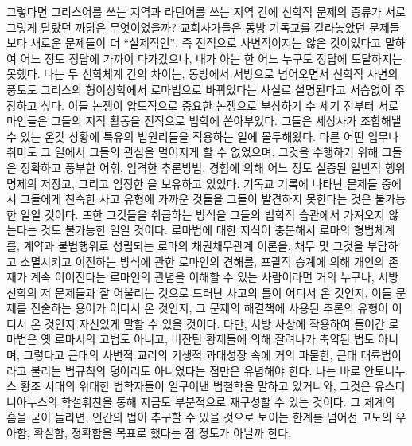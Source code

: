 그렇다면
그리스어를 쓰는 지역과
라틴어를 쓰는 지역 간에
신학적 문제의 종류가 서로 그렇게 달랐던 까닭은 무엇이었을까?
교회사가들은
동방 기독교를 갈라놓았던 문제들보다
새로운 문제들이
더 ``실제적인'',
즉 전적으로 사변적이지는 않은 것이었다고 말하여
어느 정도 정답에 가까이 다가갔으나,
내가 아는 한 어느 누구도 정답에 도달하지는 못했다.
나는
두 신학체계 간의 차이는,
동방에서 서방으로 넘어오면서
신학적 사변의 풍토도
그리스의 형이상학에서 로마법으로 바뀌었다는 사실로
설명된다고
서슴없이 주장하고 싶다.
이들 논쟁이 압도적으로 중요한 논쟁으로 부상하기
수 세기 전부터
서로마인들은 그들의 지적 활동을 전적으로 법학에 쏟아부었다.
그들은
세상사가 조합해낼 수 있는 온갖 상황에
특유의 법원리들을
적용하는 일에 몰두해왔다.
다른 어떤 업무나 취미도
그 일에서 그들의 관심을 멀어지게 할 수 없었으며,
그것을 수행하기 위해 그들은
정확하고 풍부한 어휘,
엄격한 추론방법,
경험에 의해 어느 정도 실증된 일반적 행위 명제의 저장고,
그리고 엄정한 을
보유하고 있었다.
기독교 기록에 나타난 문제들 중에서
그들에게 친숙한 사고 유형에 가까운 것들을
그들이
발견하지 못한다는 것은 불가능한 일일 것이다.
또한 그것들을 취급하는 방식을
그들의 법학적 습관에서 가져오지 않는다는 것도 불가능한 일일 것이다.
로마법에 대한 지식이 충분해서
로마의 형법체계를,
계약과 불법행위로 성립되는 로마의 채권채무관계 이론을,
채무 및 그것을 부담하고 소멸시키고 이전하는 방식에 관한
로마인의 견해를,
포괄적 승계에 의해 개인의 존재가 계속 이어진다는 로마인의 관념을
이해할 수 있는 사람이라면 거의 누구나,
서방 신학의 저 문제들과 잘 어울리는 것으로 드러난 사고의 틀이 어디서 온 것인지,
이들 문제를 진술하는 용어가 어디서 온 것인지,
그 문제의 해결책에 사용된 추론의 유형이 어디서 온 것인지
자신있게 말할 수 있을 것이다.
다만,
서방 사상에 작용하여 들어간 로마법은
옛 로마시의 고법도 아니고,
비잔틴 황제들에 의해 잘려나가 축약된 법도 아니며,
그렇다고 근대의 사변적 교리의 기생적 과대성장 속에 거의 파묻힌,
근대 대륙법이라고 불리는 법규칙의 덩어리도 아니었다는
점만은 유념해야 한다.
나는 바로 안토니누스 황조 시대의 위대한 법학자들이
일구어낸 법철학을 말하고 있거니와,
그것은 유스티니아누스의 학설휘찬을 통해 지금도 부분적으로
재구성할 수 있는 것이다.
그 체계의 흠을 굳이 들라면,
인간의 법이 추구할 수 있을 것으로 보이는 한계를 넘어선
고도의 우아함, 확실함, 정확함을
목표로 했다는 점
정도가 아닐까 한다.

